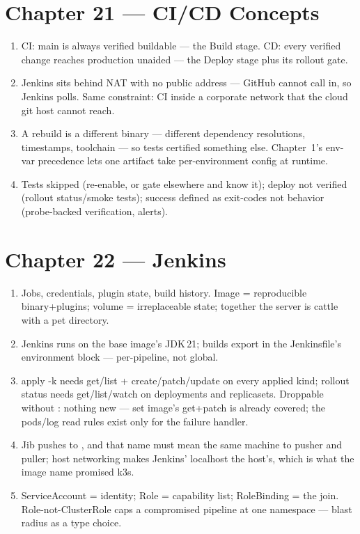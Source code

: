 \section*{Chapter 21 --- CI/CD Concepts}
\begin{enumerate}
  \item CI: main is always verified buildable --- the Build stage.
  CD: every verified change reaches production unaided --- the Deploy
  stage plus its rollout gate.
  \item Jenkins sits behind NAT with no public address --- GitHub
  cannot call in, so Jenkins polls. Same constraint: CI inside a
  corporate network that the cloud git host cannot reach.
  \item A rebuild is a different binary --- different dependency
  resolutions, timestamps, toolchain --- so tests certified something
  else. Chapter~1's env-var precedence lets one artifact take
  per-environment config at runtime.
  \item Tests skipped (re-enable, or gate elsewhere and know it);
  deploy not verified (rollout status/smoke tests); success defined
  as exit-codes not behavior (probe-backed verification, alerts).
\end{enumerate}

\section*{Chapter 22 --- Jenkins}
\begin{enumerate}
  \item Jobs, credentials, plugin state, build history. Image =
  reproducible binary+plugins; volume = irreplaceable state; together
  the server is cattle with a pet directory.
  \item Jenkins runs on the base image's JDK\,21; builds export
   in the Jenkinsfile's environment
  block --- per-pipeline, not global.
  \item apply -k needs get/list + create/patch/update on every
  applied kind; rollout status needs get/list/watch on deployments
  and replicasets. Droppable without : nothing new
  --- set image's get+patch is already covered; the pods/log read
  rules exist only for the failure handler.
  \item Jib pushes to , and that name must mean
  the same machine to pusher and puller; host networking makes
  Jenkins' localhost the host's, which is what the image name
  promised k3s.
  \item ServiceAccount = identity; Role = capability list;
  RoleBinding = the join. Role-not-ClusterRole caps a compromised
  pipeline at one namespace --- blast radius as a type choice.
\end{enumerate}

